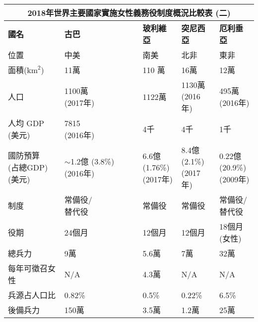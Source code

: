 \documentclass[a4paper,14pt]{extarticle}
\theoremstyle{plain}
\theoremstyle{remark}
\numberwithin{equation}{section}
\begin{document}
\begin{itemize}
\begin{center}
\begin{tabularx}{0.95\textwidth}{| p{2.7cm} | X | X | X | X |}
   \hline
   \multicolumn{5}{|c|}{\textbf{2018年世界主要國家實施女性義務役制度概況比較表 (二)}}
 \\ \hline
  \textbf{國名} & \textbf{古巴} & \textbf{玻利維亞} & \textbf{突尼西亞} & \textbf{厄利垂亞} 
  \\ \hline
  位置 & 中美 & 南美 & 北非 & 東非
  \\
  \hline
  面積($\mathrm{km}^2$) & 11萬 & 110 萬 & 16萬 & 12萬 
  \\ 
  \hline
  人口 & \parbox{3cm}{ 1100萬 \\ (2017年)} & 1122萬 & \parbox{3cm}{ 1130萬 \\ (2016年)} & \parbox{3cm}{495萬\\ (2016年)}
  \\ \hline
  \parbox{2.7cm}{人均  GDP \\ (美元)} & \parbox{3cm}{7815 \\ (2016年)} & 4千 & 4千 & 1千
  \\ \hline
  \parbox{2.7cm}{國防預算 \\(占總GDP) \\ (美元)} & \parbox{3cm}{$\sim$1.2億 \\(3.8\%)\\(2016年)}  & \parbox{3cm}{6.6億\\(1.76\%) \\ (2017年)} & \parbox{3cm}{8.4億 \\ (2.1\%) \\ (2017年)} & \parbox{3cm}{0.22億 \\ (20.9\%) \\ (2009年)}
  \\ \hline
  制度 & \parbox{3cm}{常備役/ \\ 替代役} &  常備役 & 常備役 &  \parbox{3cm}{常備役/ \\ 替代役} 
  \\ \hline
  役期 & 24個月 & 12個月 & 12個月 & \parbox{3cm}{18個月 \\(女性)}
  \\ \hline 
  總兵力 & 9萬 & 5.6萬 & 7萬 & 32萬
  \\ \hline 
  每年可徵召女性 & N/A & 4.3萬 & N/A & N/A
  \\ \hline
  兵源占人口比 & 0.82\% & 0.5\% & 0.22\% & 6.5\%
  \\ \hline 
  後備兵力 & 150萬 & 3.5萬 & 1.2萬 & 25萬 
   \\ \hline
\end{tabularx}
\end{center}


\end{itemize}
\end{document}
